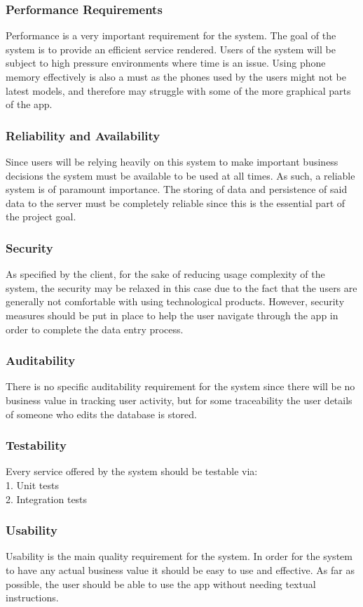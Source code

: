 \documentclass[11pt,a4paper,titlepage]{article}
\begin{document}
		\subsubsection{Performance Requirements}
			Performance is a very important requirement for the system. The goal of the system is to provide an efficient service rendered. Users of the system will be subject to high pressure environments where time is an issue. Using phone memory effectively is also a must as the phones used by the users might not be latest models, and therefore may struggle with some of the more graphical parts of the app.
		\subsubsection{Reliability and Availability}
			Since users will be relying heavily on this system to make important business decisions the system must be available to be used at all times. As such, a reliable system is of paramount importance. The storing of data and persistence of said data to the server must be completely reliable since this is the essential part of the project goal.
		\subsubsection{Security}
			As specified by the client, for the sake of reducing usage complexity of the system, the security may be relaxed in this case due to the fact that the users are generally not comfortable with using technological products. However, security measures should be put in place to help the user navigate through the app in order to complete the data entry process.
		\subsubsection{Auditability}
			There is no specific auditability requirement for the system since there will be no business value in tracking user activity, but for some traceability the user details of someone who edits the database is stored.
		\subsubsection{Testability}
			Every service offered by the system should be testable via:\\
			1. Unit tests\\
			2. Integration tests
		\subsubsection{Usability}
			Usability is the main quality requirement for the system. In order for the system to have any actual business value it should be easy to use and effective. As far as possible, the user should be able to use the app without needing textual instructions.
\end{document}
